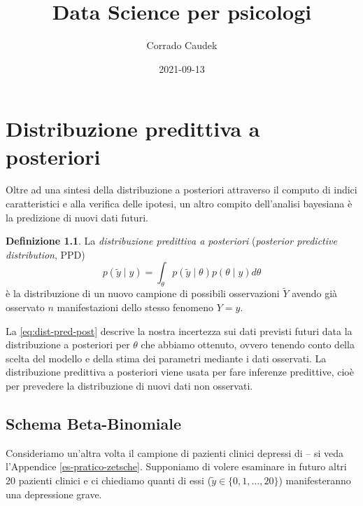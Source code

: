 \documentclass[
]{memoir}
\title{Data Science per psicologi}
\author{Corrado Caudek}
\date{2021-09-13}
\theoremstyle{definition}
\newtheorem{definition}{Definizione}[chapter]
\theoremstyle{definition}
\theoremstyle{definition}
\theoremstyle{definition}
\theoremstyle{remark}
\begin{document}
\maketitle

{
\hypersetup{linkcolor=}
\setcounter{tocdepth}{1}
\tableofcontents
}
\newpage

\vspace*{5cm}

\thispagestyle{empty}

\hypertarget{chapter-ppc}{%
\chapter{Distribuzione predittiva a posteriori}\label{chapter-ppc}}

Oltre ad una sintesi della distribuzione a posteriori attraverso il computo di indici caratteristici e alla verifica delle ipotesi, un altro compito dell'analisi bayesiana è la predizione di nuovi dati futuri.

\begin{definition}
La \emph{distribuzione predittiva a posteriori} (\emph{posterior predictive distribution}, PPD)
\begin{equation}
p(\tilde{y} \mid y) = \int_{\theta} p(\tilde{y} \mid \theta) p(\theta \mid y) d\theta
\label{eq:dist-pred-post}
\end{equation}
\noindent
è la distribuzione di un nuovo campione di possibili osservazioni \(\tilde{Y}\) avendo già osservato \(n\) manifestazioni dello stesso fenomeno \(Y = y\).
\end{definition}

La \eqref{eq:dist-pred-post} descrive la nostra incertezza sui dati previsti futuri data la distribuzione a posteriori per \(\theta\) che abbiamo ottenuto, ovvero tenendo conto della scelta del modello e della stima dei parametri mediante i dati osservati. La distribuzione predittiva a posteriori viene usata per fare inferenze predittive, cioè per prevedere la distribuzione di nuovi dati non osservati.

\hypertarget{schema-beta-bin-distr-pred-post}{%
\section{Schema Beta-Binomiale}\label{schema-beta-bin-distr-pred-post}}

Consideriamo un'altra volta il campione di pazienti clinici depressi di \citet{zetschefuture2019} -- si veda l'Appendice \ref{es-pratico-zetsche}. Supponiamo di volere esaminare in futuro altri 20 pazienti clinici e ci chiediamo quanti di essi (\(\tilde{y} \in \{0, 1, \dots, 20\}\)) manifesteranno una depressione grave.
\end{document}
